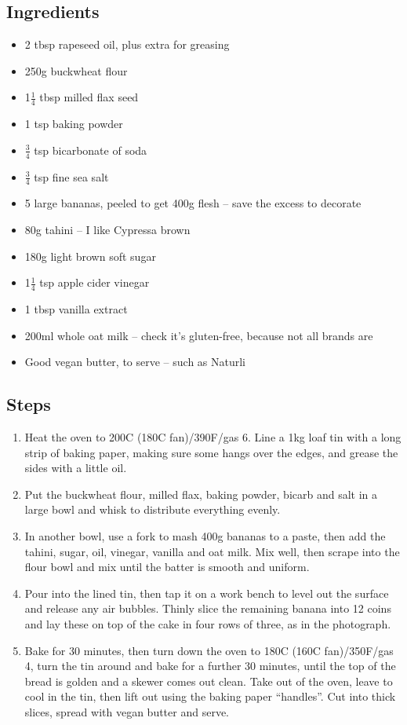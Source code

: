 \documentclass{book}
\begin{document}
\subsection*{Ingredients}
\begin{itemize}
\item 2 tbsp rapeseed oil, plus extra for greasing
\item 250g buckwheat flour
\item 1$\frac{1}{4}$ tbsp milled flax seed
\item 1 tsp baking powder
\item $\frac{3}{4}$ tsp bicarbonate of soda
\item $\frac{3}{4}$ tsp fine sea salt
\item 5 large bananas, peeled to get 400g flesh – save the excess to decorate
\item 80g tahini – I like Cypressa brown
\item 180g light brown soft sugar
\item 1$\frac{1}{4}$ tsp apple cider vinegar
\item 1 tbsp vanilla extract
\item 200ml whole oat milk – check it’s gluten-free, because not all brands are
\item Good vegan butter, to serve – such as Naturli
\end{itemize}

\subsection*{Steps}
\begin{enumerate}
\item Heat the oven to 200C (180C fan)/390F/gas 6. Line a 1kg loaf tin with a long strip of baking paper, making sure some hangs over the edges, and grease the sides with a little oil.
\item Put the buckwheat flour, milled flax, baking powder, bicarb and salt in a large bowl and whisk to distribute everything evenly.
\item In another bowl, use a fork to mash 400g bananas to a paste, then add the tahini, sugar, oil, vinegar, vanilla and oat milk. Mix well, then scrape into the flour bowl and mix until the batter is smooth and uniform.
\item Pour into the lined tin, then tap it on a work bench to level out the surface and release any air bubbles. Thinly slice the remaining banana into 12 coins and lay these on top of the cake in four rows of three, as in the photograph.
\item Bake for 30 minutes, then turn down the oven to 180C (160C fan)/350F/gas 4, turn the tin around and bake for a further 30 minutes, until the top of the bread is golden and a skewer comes out clean. Take out of the oven, leave to cool in the tin, then lift out using the baking paper “handles”. Cut into thick slices, spread with vegan butter and serve.
\end{enumerate}
\newpage
\end{document}
